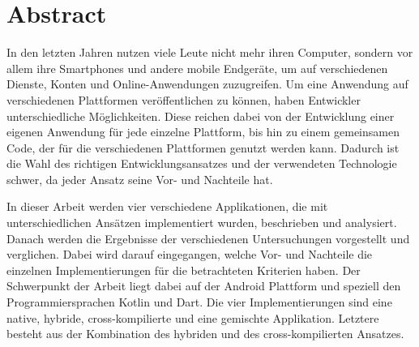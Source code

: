 \chapter*{Abstract}

\bigskip 

In den letzten Jahren nutzen viele Leute nicht mehr ihren Computer, sondern vor allem ihre Smartphones und andere mobile Endgeräte, um auf verschiedenen Dienste, Konten und Online-Anwendungen zuzugreifen. Um eine Anwendung auf verschiedenen Plattformen veröffentlichen zu können, haben Entwickler unterschiedliche Möglichkeiten. Diese reichen dabei von der Entwicklung einer eigenen Anwendung für jede einzelne Plattform, bis hin zu einem gemeinsamen Code, der für die verschiedenen Plattformen genutzt werden kann. Dadurch ist die Wahl des richtigen Entwicklungsansatzes und der verwendeten  Technologie schwer, da jeder Ansatz seine Vor- und Nachteile hat. 

In dieser Arbeit werden vier verschiedene Applikationen, die mit unterschiedlichen Ansätzen implementiert wurden, beschrieben und analysiert. Danach werden die Ergebnisse der verschiedenen Untersuchungen vorgestellt und verglichen. Dabei wird darauf eingegangen, welche Vor- und Nachteile die einzelnen Implementierungen für die betrachteten Kriterien haben. Der Schwerpunkt der Arbeit liegt dabei auf der Android Plattform und speziell den Programmiersprachen Kotlin und Dart. Die vier Implementierungen sind eine native, hybride, cross-kompilierte und eine gemischte Applikation. Letztere besteht aus der Kombination des hybriden und des cross-kompilierten Ansatzes.